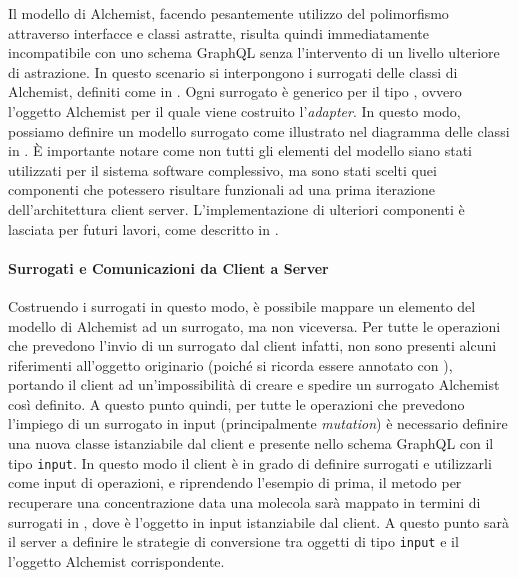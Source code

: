 Il modello di Alchemist, facendo pesantemente utilizzo del polimorfismo attraverso interfacce e classi astratte, risulta quindi immediatamente
incompatibile con uno schema GraphQL senza l'intervento di un livello ulteriore di astrazione. In questo scenario si interpongono i surrogati delle 
classi di Alchemist, definiti come in . Ogni surrogato è generico per il tipo , ovvero l'oggetto Alchemist
per il quale viene costruito l'\textit{adapter}. In questo modo, possiamo definire un modello surrogato come illustrato nel diagramma delle classi in
. È importante notare come non tutti gli elementi del modello siano stati utilizzati per il sistema software complessivo,
ma sono stati scelti quei componenti che potessero risultare funzionali ad una prima iterazione dell'architettura client server. L'implementazione
di ulteriori componenti è lasciata per futuri lavori, come descritto in .


\paragraph{Surrogati e Comunicazioni da Client a Server}
Costruendo i surrogati in questo modo, è possibile mappare un elemento del modello di Alchemist ad un surrogato, ma non viceversa. Per tutte le operazioni
che prevedono l'invio di un surrogato dal client infatti, non sono presenti alcuni riferimenti all'oggetto originario (poiché si ricorda essere annotato con 
), portando il client ad un'impossibilità di creare e spedire un surrogato Alchemist così definito.
A questo punto quindi, per tutte le operazioni che prevedono l'impiego di un surrogato in input (principalmente
\textit{mutation}) è necessario definire una nuova classe istanziabile dal client e presente nello schema GraphQL con il tipo \texttt{input}. 
In questo modo il client è in grado di definire surrogati e utilizzarli come input di operazioni, e riprendendo l'esempio di prima, il metodo
per recuperare una concentrazione data una molecola sarà mappato in termini di surrogati in ,
dove  è l'oggetto in input istanziabile dal client. A questo punto sarà il server a definire le strategie di conversione
tra oggetti di tipo \texttt{input} e il l'oggetto Alchemist corrispondente.

